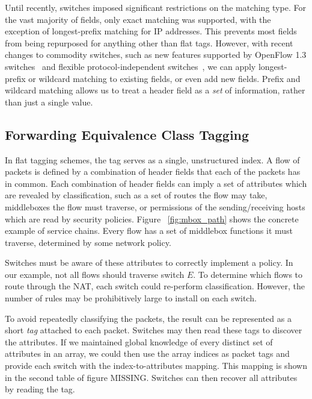 Until recently, switches imposed significant restrictions on the matching type.  For the vast majority of fields, only exact matching was supported, with the exception of longest-prefix matching for IP addresses. This prevents most fields from being repurposed for anything other than flat tags. However, with recent changes to commodity switches, such as new features supported by OpenFlow 1.3 switches~\cite{of13} and flexible protocol-independent switches~\cite{P4}, we can apply longest-prefix or wildcard matching to existing fields, or even add new fields. Prefix and wildcard matching allows us to treat a header field as a \emph{set} of information, rather than just a single value. 

\subsection{Forwarding Equivalence Class Tagging}
In flat tagging schemes, the tag serves as a single, unstructured index.  A flow of packets is defined by a combination of header fields that each of the packets has in common. Each combination of header fields can imply a set of attributes which are revealed by classification, such as a set of routes the flow may take, middleboxes the flow must traverse, or permissions of the sending/receiving hosts which are read by security policies.  Figure ~\ref{fig:mbox_path} shows the concrete example of service chains. Every flow has a set of middlebox functions it must traverse, determined by some network policy.

Switches must be aware of these attributes to correctly implement a policy. In our example, not all flows should traverse switch $E$. To determine which flows to route through the NAT, each switch could re-perform classification. However, the number of rules may be prohibitively large to install on each switch.  

To avoid repeatedly classifying the packets, the result can be represented as a short \textit{tag} attached
to each packet. Switches may then read these tags to discover the attributes. If we maintained global knowledge of every distinct set of attributes in an array, we could then use the array indices as packet tags and provide each switch with the index-to-attributes mapping. This mapping is shown in the second table of figure MISSING. Switches can then recover all attributes by reading the tag.


